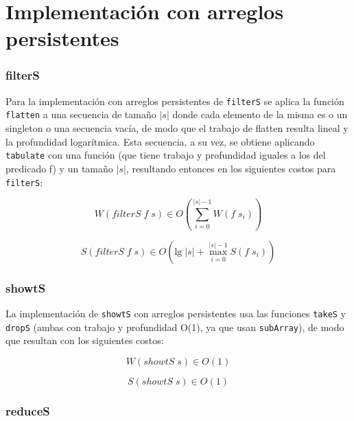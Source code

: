 \documentclass[a4paper,10pt]{article}
\begin{document}
\part*{Implementación con arreglos persistentes}

\section*{filterS}

Para la implementación con arreglos persistentes de \texttt{filterS} se aplica
la función \texttt{flatten} a una secuencia de tamaño $\vert s \vert$ donde cada
elemento de la misma es o un singleton o una secuencia vacía, de modo que el
trabajo de flatten resulta lineal y la profundidad logarítmica. Esta secuencia,
a su vez, se obtiene aplicando \texttt{tabulate} con una función (que tiene
trabajo y profundidad iguales a los del predicado f) y un tamaño $\vert s \vert$,
resultando entonces en los siguientes costos para \texttt{filterS}:

\begin{equation*}
    W \left( filterS \; f \; s \right) \in
    O \left( \sum_{i=0}^{\vert s \vert -1} W(f \; s_i) \right)
\end{equation*}

\begin{equation*}
    S \left( filterS \; f \; s \right) \in
    O \left( \text{lg} \; \vert s \vert + \max_{i=0}^{\vert s \vert -1} S(f \; s_i) \right)
\end{equation*}


\section*{showtS}

La implementación de \texttt{showtS} con arreglos persistentes usa las funciones
\texttt{takeS} y \texttt{dropS} (ambas con trabajo y profundidad O(1), ya que usan
\texttt{subArray}), de modo que resultan con los siguientes costos:

\begin{equation*}
    W \left( showtS \; s \right) \in
    O \left( 1 \right)
\end{equation*}

\begin{equation*}
    S \left( showtS \; s \right) \in
    O \left( 1 \right)
\end{equation*}


\section*{reduceS}
\end{document}
